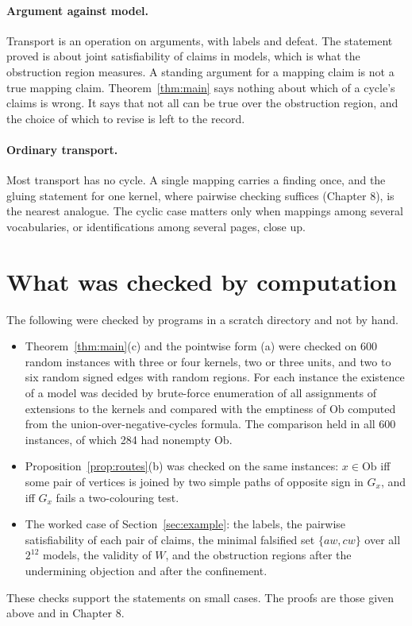 \documentclass[11pt]{article}
\theoremstyle{plain}
\theoremstyle{definition}
\theoremstyle{remark}
\newcommand{\Ob}{\mathrm{Ob}}
\begin{document}
\paragraph{Argument against model.} Transport is an operation on arguments, with labels and defeat. The statement proved is about joint satisfiability of claims in models, which is what the obstruction region measures. A standing argument for a mapping claim is not a true mapping claim. Theorem~\ref{thm:main} says nothing about which of a cycle's claims is wrong. It says that not all can be true over the obstruction region, and the choice of which to revise is left to the record.

\paragraph{Ordinary transport.} Most transport has no cycle. A single mapping carries a finding once, and the gluing statement for one kernel, where pairwise checking suffices (Chapter 8), is the nearest analogue. The cyclic case matters only when mappings among several vocabularies, or identifications among several pages, close up.

\section{What was checked by computation}\label{sec:checks}

The following were checked by programs in a scratch directory and not by hand.
\begin{itemize}[nosep]
\item Theorem~\ref{thm:main}(c) and the pointwise form (a) were checked on 600 random instances with three or four kernels, two or three units, and two to six random signed edges with random regions. For each instance the existence of a model was decided by brute-force enumeration of all assignments of extensions to the kernels and compared with the emptiness of $\Ob$ computed from the union-over-negative-cycles formula. The comparison held in all 600 instances, of which 284 had nonempty $\Ob$.
\item Proposition~\ref{prop:routes}(b) was checked on the same instances: $x\in\Ob$ iff some pair of vertices is joined by two simple paths of opposite sign in $G_x$, and iff $G_x$ fails a two-colouring test.
\item The worked case of Section~\ref{sec:example}: the labels, the pairwise satisfiability of each pair of claims, the minimal falsified set $\{aw,cw\}$ over all $2^{12}$ models, the validity of $W$, and the obstruction regions after the undermining objection and after the confinement.
\end{itemize}
These checks support the statements on small cases. The proofs are those given above and in Chapter 8.
\end{document}
